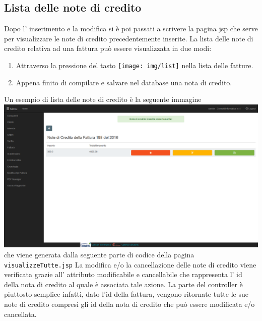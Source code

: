 \documentclass[12pt]{book}
\begin{document}
\subsection{Lista delle note di credito}
Dopo l' inserimento e la modifica si è poi passati a scrivere la pagina jsp
che serve per visualizzare le note di credito precedentemente inserite.
La lista delle note di credito relativa ad una fattura può essere visualizzata
in due modi:
\begin{enumerate}
    \item Attraverso la pressione del tasto \texttt{[image: img/list]}
         nella lista delle fatture.
    \item Appena finito di compilare e salvare nel database una nota di credito.
\end{enumerate}
Un esempio di lista delle note di credito è la seguente immagine
\newline
\newline
\includegraphics[scale=0.4]{img/visualizzazione_note_credito}
\newline
che viene generata dalla seguente parte di codice della pagina \texttt{visualizzeTutte.jsp}
La modifica e/o la cancellazione delle note di credito viene verificata 
grazie all' attributo modificabile e cancellabile che rappresenta l' id della
nota di credito al quale è associata tale azione.
La parte del controller è piuttosto semplice infatti, dato l'id della fattura,
vengono ritornate tutte le sue note di credito compresi gli id della nota di 
credito che può essere modificata e/o cancellata.

\end{document}
